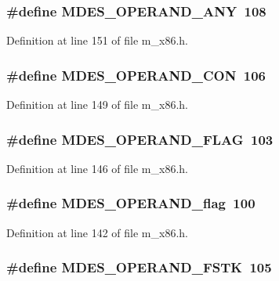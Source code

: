 \subsubsection{\setlength{\rightskip}{0pt plus 5cm}\#define MDES\_\-OPERAND\_\-ANY~108}\label{m__x86_8h_d1d05f6a4132d5ca383ae942d9b69ec2}




Definition at line 151 of file m\_\-x86.h.
\subsubsection{\setlength{\rightskip}{0pt plus 5cm}\#define MDES\_\-OPERAND\_\-CON~106}\label{m__x86_8h_9b63342547a5a75a2cb96a1111dc99ee}




Definition at line 149 of file m\_\-x86.h.
\subsubsection{\setlength{\rightskip}{0pt plus 5cm}\#define MDES\_\-OPERAND\_\-FLAG~103}\label{m__x86_8h_7462d89e1e99aff21fe6c2e2d06db7c0}




Definition at line 146 of file m\_\-x86.h.
\subsubsection{\setlength{\rightskip}{0pt plus 5cm}\#define MDES\_\-OPERAND\_\-flag~100}\label{m__x86_8h_302e290b4a3442996e388f4c8bf18f18}




Definition at line 142 of file m\_\-x86.h.
\subsubsection{\setlength{\rightskip}{0pt plus 5cm}\#define MDES\_\-OPERAND\_\-FSTK~105}\label{m__x86_8h_2dc11e73687a82435df30c5893a73cd0}




